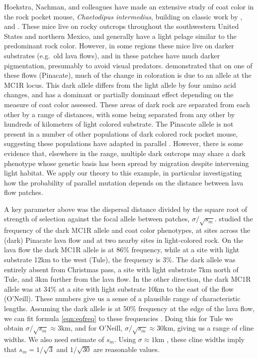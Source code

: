 \documentclass{article}
\begin{document}
Hoekstra, Nachman, and colleagues have made an extensive study of coat color in the rock pocket mouse, 
\emph{Chaetodipus intermedius}, building on classic work by
\citet{benson1933concealing}, \citet{DiceBlossom1937} and \citet{dice1940ecologic}.
These mice live on rocky outcrops throughout the southwestern United States and northern Mexico, 
and generally have a light pelage similar to the predominant rock color.
However, in some regions these mice live on darker substrates (e.g.\ old lava flows),
and in these patches have much darker pigmentation, 
presumably to avoid visual predators.
\citet{nachman2003genetic} demonstrated that on one of these flows (Pinacate), 
much of the change in coloration is due to an allele at the MC1R locus.
This dark allele differs from the light allele by four amino acid changes, 
and has a dominant or partially dominant effect depending on the measure of coat color assessed. 
These areas of dark rock are separated from each other by a range of distances, 
with some being separated from any other by hundreds of kilometers of light colored substrate. 
The Pinacate allele is not present in a number of other populations of dark colored rock pocket mouse, 
suggesting these populations have adapted in parallel \citep{hoekstra2003different}.
However, there is some evidence \citep{Hoekstra:05} that, elsewhere in the range, 
multiple dark outcrops may share a dark phenotype whose genetic basis has been spread by migration
despite intervening light habitat. 
We apply our theory to this example,
in particular investigating how the probability of parallel mutation depends on 
the distance between lava flow patches.

A key parameter above was the dispersal distance divided by the square root of strength of selection against the focal allele between patches, $\sigma/\sqrt{s_m}$. 
\citet{hoekstra2004ecological} studied the frequency of the dark MC1R allele and coat color phenotypes, 
at sites across the (dark) Pinacate lava flow and at two nearby sites in light-colored rock.
On the lava flow the dark MC1R allele is at 86\% frequency,
while at a site with light substrate 12km to the west (Tule), the frequency is 3\%.
The dark allele was entirely absent from Christmas pass, a site with light substrate 7km north of Tule, and 3km further from the lava flow.
In the other direction, the dark MC1R allele was at 34\% at a site with light substrate 10km to the east of the flow (O'Neill).
These numbers give us a sense of a plausible range of characteristic lengths.
Assuming the dark allele is at 50\% frequency at the edge of the lava flow, 
we can fit formula \eqref{eqn:eqfreq} to these frequencies
\citep[similar to][]{hoekstra2004ecological}.
Doing this for Tule we obtain $\sigma/\sqrt{s_m} \approx 3$km, 
and for O'Neill, $\sigma/\sqrt{s_m} \approx 30$km, giving us a range of cline widths. 
We also need estimate of $s_m$. 
Using $\sigma \approx 1$km \citep{french1968dispersal,allred1963range}, 
these cline widths imply that $s_m=1/\sqrt{3}$ and $1/\sqrt{30}$ are reasonable values.
\end{document}
